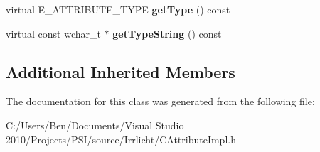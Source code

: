 \begin{DoxyCompactItemize}
\item 
\hypertarget{classirr_1_1io_1_1_c_color_attribute_a1a16206eec0d6decd7c5fafd686bed41}{virtual E\-\_\-\-A\-T\-T\-R\-I\-B\-U\-T\-E\-\_\-\-T\-Y\-P\-E {\bfseries get\-Type} () const }\label{classirr_1_1io_1_1_c_color_attribute_a1a16206eec0d6decd7c5fafd686bed41}

\item 
\hypertarget{classirr_1_1io_1_1_c_color_attribute_a39f984d87342f56091da70bc83d4c5bb}{virtual const wchar\-\_\-t $\ast$ {\bfseries get\-Type\-String} () const }\label{classirr_1_1io_1_1_c_color_attribute_a39f984d87342f56091da70bc83d4c5bb}

\end{DoxyCompactItemize}
\subsection*{Additional Inherited Members}


The documentation for this class was generated from the following file\-:\begin{DoxyCompactItemize}
\item 
C\-:/\-Users/\-Ben/\-Documents/\-Visual Studio 2010/\-Projects/\-P\-S\-I/source/\-Irrlicht/C\-Attribute\-Impl.\-h\end{DoxyCompactItemize}
